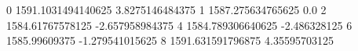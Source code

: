 0 1591.1031494140625 3.8275146484375
1 1587.275634765625 0.0
2 1584.61767578125 -2.657958984375
4 1584.789306640625 -2.486328125
6 1585.99609375 -1.279541015625
8 1591.631591796875 4.35595703125
